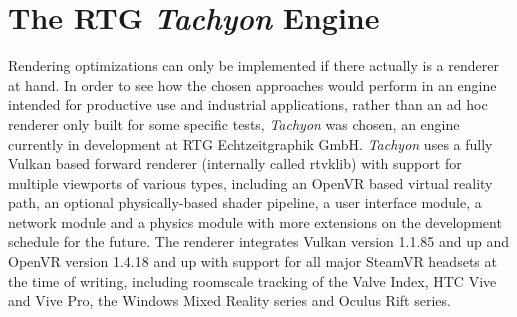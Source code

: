 
\chapter{The RTG \textit{Tachyon} Engine} \label{Tachyon}

Rendering optimizations can only be implemented if there actually is a renderer at hand. In order to see how the chosen approaches would perform in an engine intended for productive use and industrial applications, rather than an ad hoc renderer only built for some specific tests, \textit{Tachyon} was chosen, an engine currently in development at RTG Echtzeitgraphik GmbH. \textit{Tachyon} uses a fully Vulkan based forward renderer (internally called rtvklib) with support for multiple viewports of various types, including an OpenVR based virtual reality path, an optional physically-based shader pipeline, a user interface module, a network module and a physics module with more extensions on the development schedule for the future. The renderer integrates Vulkan version 1.1.85 and up and OpenVR version 1.4.18 and up with support for all major SteamVR headsets at the time of writing, including roomscale tracking of the Valve Index, HTC Vive and Vive Pro, the Windows Mixed Reality series and Oculus Rift series. 

